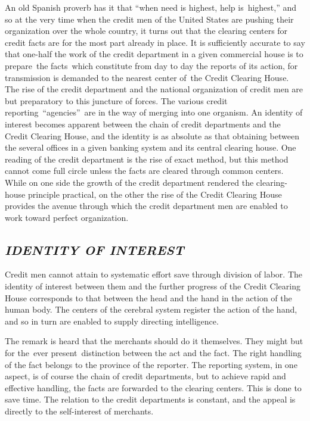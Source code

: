 \documentclass[openany,nobib]{tufte-book}
\begin{document}
\enlargethispage{\baselineskip}

An old Spanish proverb has it that ``when need is highest, help
is~highest,'' and so at the very time when the credit men of the United
States are pushing their organization over the whole country, it turns
out that the clearing centers for credit facts are for the most part
already in place. It is sufficiently accurate to say that one-half the
work of the credit department in a given commercial house is to
prepare~the facts~which constitute from day to day the reports of its
action, for transmission is demanded to the nearest center of~the Credit
Clearing House. The rise of the credit department and the national
organization of credit men are but preparatory to this juncture of
forces. The various credit reporting~``agencies''~are in the way of
merging into one organism. An identity of interest becomes apparent
between the chain of credit departments and the Credit Clearing House,
and the identity is as absolute as that obtaining between the several
offices in a given banking system and its central clearing house. One
reading of the credit department is the rise of exact method, but this
method cannot come full circle unless the facts are cleared through
common centers. While on one side the growth of the credit department
rendered the clearing-house principle practical, on the other the rise
of the Credit Clearing House provides the avenue through which the
credit department men are enabled to work toward perfect organization.~

\hypertarget{identity-of-interest}{%
\subsection{\texorpdfstring{\emph{IDENTITY OF
INTEREST}}{IDENTITY OF INTEREST}}\label{identity-of-interest}}

Credit men cannot attain to systematic effort save through division of
labor. The identity of interest between them and the further progress of
the Credit Clearing House corresponds to that between the head and the
hand in the action of the human body. The centers of the cerebral system
register the action of the hand, and so in turn are enabled to supply
directing intelligence.~

The remark is heard that the merchants should do it themselves. They
might but for the~ever present~distinction between the act and the fact.
The right handling of the fact belongs to the province of the reporter.
The reporting system, in one aspect, is of course the chain of credit
departments, but to achieve rapid and effective handling, the facts are
forwarded to the clearing centers. This is done to save time. The
relation to the credit departments is constant, and the appeal is
directly to the self-interest of merchants.~
\end{document}

